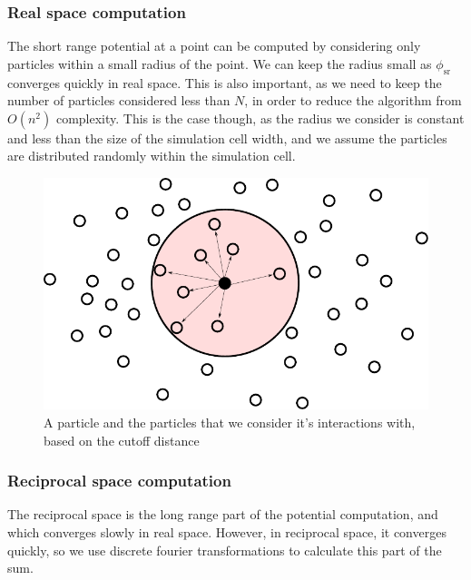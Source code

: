 \documentclass[pdftex,twoside,a4paper]{report}
\newcommand{\bcen}{\begin{center}}
\newcommand{\ecen}{\end{center}}
\begin{document}
\subsubsection{Real space computation}
The short range potential at a point can be computed by considering only particles within a small radius of the point. We can keep the radius small as $\phi_{\text{sr}}$ converges quickly in real space. This is also important, as we need to keep the number of particles considered less than $N$, in order to reduce the algorithm from $O(n^2)$ complexity. This is the case though, as the radius we consider is constant and less than the size of the simulation cell width, and we assume the particles are distributed randomly within the simulation cell.
\begin{figure}[H]
\bcen \includegraphics{figures/cutoff.pdf} \ecen
\caption{A particle and the particles that we consider it's interactions with, based on the cutoff distance}
\end{figure}

\subsubsection{Reciprocal space computation}
The reciprocal space is the long range part of the potential computation, and which converges slowly in real space. However, in reciprocal space, it converges quickly, so we use discrete fourier transformations to calculate this part of the sum.\\
\end{document}
